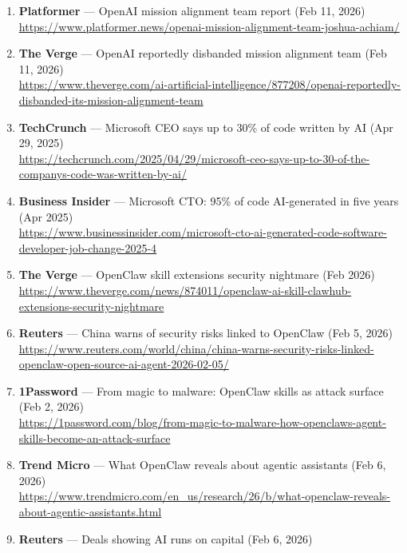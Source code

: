\documentclass[11pt]{article}
\begin{document}
\begin{enumerate}
  2024)\\
  \url{https://www.reuters.com/technology/artificial-intelligence/openai-co-founder-sutskevers-new-safety-focused-ai-startup-ssi-raises-1-billion-2024-09-04/}
\item
  \textbf{Platformer} --- OpenAI mission alignment team report (Feb 11,
  2026)\\
  \url{https://www.platformer.news/openai-mission-alignment-team-joshua-achiam/}
\item
  \textbf{The Verge} --- OpenAI reportedly disbanded mission alignment
  team (Feb 11, 2026)\\
  \url{https://www.theverge.com/ai-artificial-intelligence/877208/openai-reportedly-disbanded-its-mission-alignment-team}
\item
  \textbf{TechCrunch} --- Microsoft CEO says up to 30\% of code written
  by AI (Apr 29, 2025)\\
  \url{https://techcrunch.com/2025/04/29/microsoft-ceo-says-up-to-30-of-the-companys-code-was-written-by-ai/}
\item
  \textbf{Business Insider} --- Microsoft CTO: 95\% of code AI-generated
  in five years (Apr 2025)\\
  \url{https://www.businessinsider.com/microsoft-cto-ai-generated-code-software-developer-job-change-2025-4}
\item
  \textbf{The Verge} --- OpenClaw skill extensions security nightmare
  (Feb 2026)\\
  \url{https://www.theverge.com/news/874011/openclaw-ai-skill-clawhub-extensions-security-nightmare}
\item
  \textbf{Reuters} --- China warns of security risks linked to OpenClaw
  (Feb 5, 2026)\\
  \url{https://www.reuters.com/world/china/china-warns-security-risks-linked-openclaw-open-source-ai-agent-2026-02-05/}
\item
  \textbf{1Password} --- From magic to malware: OpenClaw skills as
  attack surface (Feb 2, 2026)\\
  \url{https://1password.com/blog/from-magic-to-malware-how-openclaws-agent-skills-become-an-attack-surface}
\item
  \textbf{Trend Micro} --- What OpenClaw reveals about agentic
  assistants (Feb 6, 2026)\\
  \url{https://www.trendmicro.com/en_us/research/26/b/what-openclaw-reveals-about-agentic-assistants.html}
\item
  \textbf{Reuters} --- Deals showing AI runs on capital (Feb 6, 2026)\\

\end{enumerate}
\end{document}
